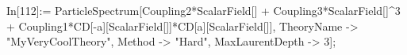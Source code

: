 In[112]:= ParticleSpectrum[Coupling2*ScalarField[] + Coupling3*ScalarField[]^3 + Coupling1*CD[-a][ScalarField[]]*CD[a][ScalarField[]], TheoryName -> "MyVeryCoolTheory", Method -> "Hard", MaxLaurentDepth -> 3]; 